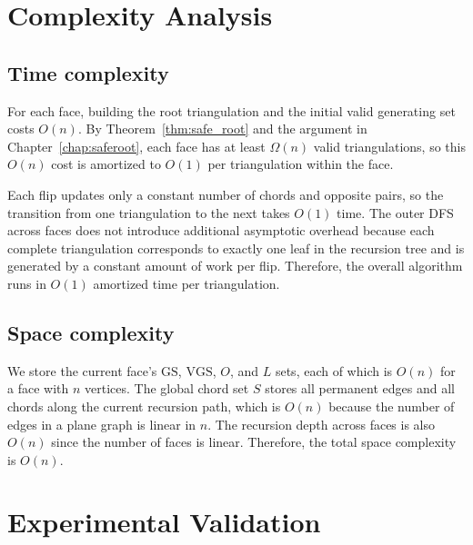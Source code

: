 \documentclass[12pt,a4paper]{report}
\theoremstyle{definition}
\theoremstyle{remark}
\newcommand{\ChordSet}{S}
\newcommand{\GS}{\mathrm{GS}}
\newcommand{\VGS}{\mathrm{VGS}}
\begin{document}
\chapter{Complexity Analysis}
\label{chap:complexity}

\section{Time complexity}

For each face, building the root triangulation and the initial valid generating set costs
$O(n)$. By Theorem~\ref{thm:safe_root} and the argument in
Chapter~\ref{chap:saferoot}, each face has at least $\Omega(n)$ valid triangulations, so
this $O(n)$ cost is amortized to $O(1)$ per triangulation within the face.

Each flip updates only a constant number of chords and opposite pairs, so the transition
from one triangulation to the next takes $O(1)$ time. The outer DFS across faces does
not introduce additional asymptotic overhead because each complete triangulation
corresponds to exactly one leaf in the recursion tree and is generated by a constant
amount of work per flip. Therefore, the overall algorithm runs in $O(1)$ amortized time
per triangulation.

\section{Space complexity}

We store the current face's $\GS$, $\VGS$, $O$, and $L$ sets, each of which is $O(n)$
for a face with $n$ vertices. The global chord set $\ChordSet$ stores all permanent edges
and all chords along the current recursion path, which is $O(n)$ because the number of
edges in a plane graph is linear in $n$. The recursion depth across faces is also $O(n)$
since the number of faces is linear. Therefore, the total space complexity is $O(n)$.

\chapter{Experimental Validation}
\label{chap:experiments}
\end{document}

